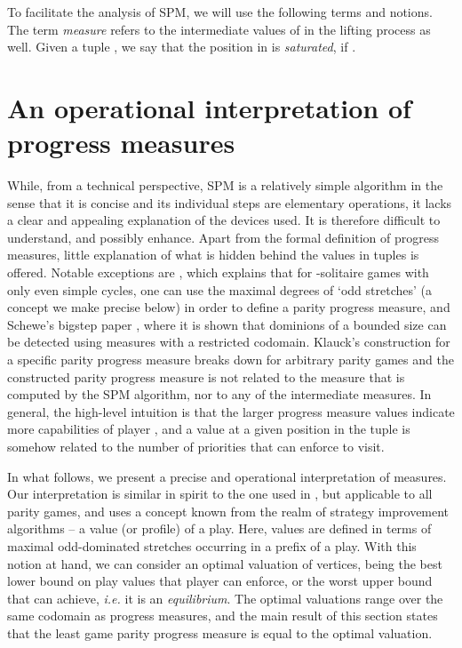 \documentclass{eptcs}
\newcommand{\odd}{\ensuremath{\square}\xspace}
\newcommand{\even}{\ensuremath{\Diamond}\xspace}
\newcommand{\ie}{\emph{i.e.}\xspace}
\newcommand{\priosym}{\mathcal{P}}
\begin{document}
To facilitate the analysis of SPM, we will use the following  terms and notions. The term \emph{measure} refers to the intermediate values of  in the lifting process as well. Given a tuple , we say that the position  in  is \emph{saturated}, if .


\section{An operational interpretation of progress measures}
\label{sec:interpretation}

\def\globmaxprio{max \priosym}

\def\eventups{\mathbb{M}^{\even}}
\def\exteventups{\mathbb{M}^{\even}_{ext}}
\def\oddtups{\mathbb{M}^{\odd}}

\def\allplays{\Pi}
\def\profilesym{\theta}
\newcommand{\profilefun}[1]{\profilesym_{#1}}
\newcommand{\profile}[2]{\profilesym_{#1}(#2)}

\newcommand{\maxval}[2]{\varphi^{*}_{#1}(#2)}

\newcommand{\succtup}[2]{\textsf{succ}_{#1}(#2)}

While, from a technical perspective, SPM is a relatively simple
algorithm in the sense that it is
concise and its individual steps are elementary operations, it lacks
a clear and appealing explanation of the devices used. It is therefore
difficult to understand, and possibly enhance. Apart from the formal
definition of progress measures, little explanation
of what is hidden behind the values in tuples is offered.
Notable exceptions are \cite{Klau:01}, which explains that for
-solitaire games with only even simple cycles, one can use the 
maximal degrees of `odd
stretches' (a concept we make precise below) in order to define a
parity progress measure, and Schewe's bigstep paper \cite{Sch:07},
where it is shown that dominions of a bounded size can be detected
using measures with a restricted codomain. Klauck's construction
for a specific parity progress measure breaks down for arbitrary parity
games and the constructed parity progress measure is not related to
the measure that is computed by the SPM algorithm, nor to any of the
intermediate measures. In general, the  high-level
intuition is that the larger progress measure values indicate more
capabilities of player , and a value at a given position in the
tuple is somehow related to the number of priorities that 
can enforce to visit.\medskip

In what follows, we present a precise and operational interpretation
of measures. Our interpretation is similar in spirit to the one used in \cite{Klau:01},
but applicable to all parity games, and uses a concept known
from the realm of strategy improvement algorithms -- a value (or
profile) of a play. Here, values are defined in terms of maximal odd-dominated
stretches occurring in a prefix of a play. With this notion at hand,
we can consider an optimal valuation of vertices, being the best
lower bound on play values that player  can enforce, or the
worst upper bound that  can achieve, \ie it is an \emph{equilibrium}.
The optimal valuations range over the same codomain as progress
measures, and the main result of this section states that the least
game parity progress measure is equal to the optimal valuation.\medskip
\end{document}

